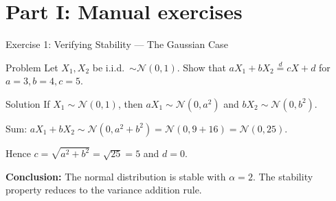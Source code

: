 \documentclass[9pt, aspectratio=169, t]{beamer}
\theoremstyle{definition}
\begin{document}
\section{Part I: Manual exercises}

\begin{frame}{Exercise 1: Verifying Stability --- The Gaussian Case}
\begin{block}{Problem}
Let $X_1, X_2$ be i.i.d.\ $\sim \mathcal{N}(0, 1)$. Show that
$a X_1 + b X_2 \stackrel{d}{=} c X + d$ for $a=3, b=4, c=5$.
\end{block}

\begin{exampleblock}{Solution}
If $X_1 \sim \mathcal{N}(0, 1)$, then $aX_1 \sim \mathcal{N}(0, a^2)$ and $bX_2 \sim \mathcal{N}(0, b^2)$.

Sum: $aX_1 + bX_2 \sim \mathcal{N}(0, a^2 + b^2) = \mathcal{N}(0, 9 + 16) = \mathcal{N}(0, 25)$.

Hence $c = \sqrt{a^2 + b^2} = \sqrt{25} = 5$ and $d = 0$.

\vspace{0.2cm}
\textbf{Conclusion:} The normal distribution is stable with $\alpha = 2$. The stability property reduces to the variance addition rule.
\end{exampleblock}
\end{frame}
\end{document}
